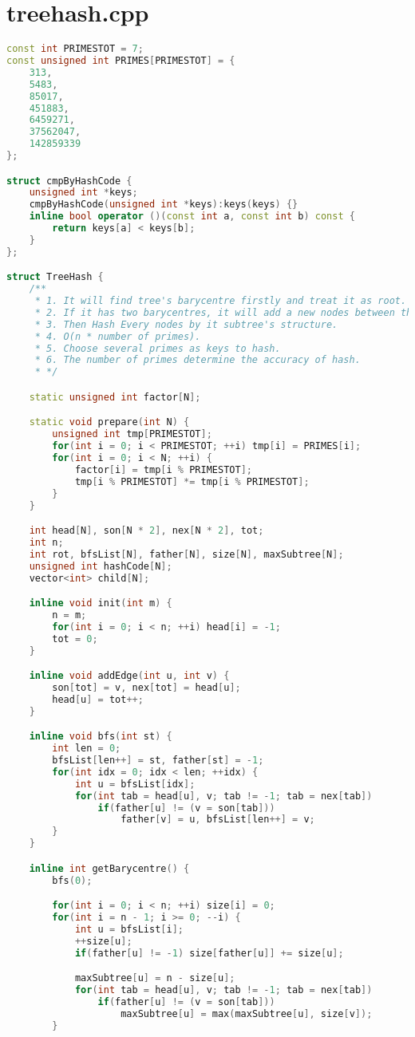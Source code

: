 \section{treehash.cpp}
\begin{lstlisting}[language=c++]
const int PRIMESTOT = 7;
const unsigned int PRIMES[PRIMESTOT] = {
	313,
	5483, 
	85017, 
	451883, 
	6459271,
	37562047,
	142859339
};

struct cmpByHashCode {
	unsigned int *keys;
	cmpByHashCode(unsigned int *keys):keys(keys) {}
	inline bool operator ()(const int a, const int b) const {
		return keys[a] < keys[b];
	}
};

struct TreeHash {
	/**
	 * 1. It will find tree's barycentre firstly and treat it as root.
	 * 2. If it has two barycentres, it will add a new nodes between them.
	 * 3. Then Hash Every nodes by it subtree's structure.
	 * 4. O(n * number of primes).
	 * 5. Choose several primes as keys to hash.
	 * 6. The number of primes determine the accuracy of hash.
	 * */

	static unsigned int factor[N];

	static void prepare(int N) {
		unsigned int tmp[PRIMESTOT];
		for(int i = 0; i < PRIMESTOT; ++i) tmp[i] = PRIMES[i];
		for(int i = 0; i < N; ++i) {
			factor[i] = tmp[i % PRIMESTOT];
			tmp[i % PRIMESTOT] *= tmp[i % PRIMESTOT];
		}
	}

	int head[N], son[N * 2], nex[N * 2], tot;
	int n;
	int rot, bfsList[N], father[N], size[N], maxSubtree[N];
	unsigned int hashCode[N];
	vector<int> child[N];

	inline void init(int m) {
		n = m;
		for(int i = 0; i < n; ++i) head[i] = -1;
		tot = 0;
	}

	inline void addEdge(int u, int v) {
		son[tot] = v, nex[tot] = head[u];
		head[u] = tot++;
	}

	inline void bfs(int st) {
		int len = 0;
		bfsList[len++] = st, father[st] = -1;
		for(int idx = 0; idx < len; ++idx) {
			int u = bfsList[idx];
			for(int tab = head[u], v; tab != -1; tab = nex[tab])
				if(father[u] != (v = son[tab]))
					father[v] = u, bfsList[len++] = v;
		}
	}

	inline int getBarycentre() {
		bfs(0);

		for(int i = 0; i < n; ++i) size[i] = 0;
		for(int i = n - 1; i >= 0; --i) {
			int u = bfsList[i];
			++size[u];
			if(father[u] != -1) size[father[u]] += size[u];

			maxSubtree[u] = n - size[u];
			for(int tab = head[u], v; tab != -1; tab = nex[tab])
				if(father[u] != (v = son[tab]))
					maxSubtree[u] = max(maxSubtree[u], size[v]);
		}


\end{lstlisting}
